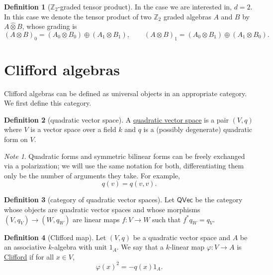 \documentclass[a4paper,10pt]{scrreprt}
\newcommand{\Z}{\mathbb{Z}}
\newcommand{\defn}[1]{\ul{#1}}
\theoremstyle{definition}
\newtheorem{definition}{Definition}[section]
\theoremstyle{plain}
\theoremstyle{remark}
\newtheorem{note}{Note}[section]
\begin{document}
\begin{definition}[$\Z_2$-graded tensor product]
  \label{def:z2gradedtensorproduct}
  In the case we are interested in, $d = 2$. In this case we denote the tensor product of two $\Z_{2}$ graded algebras $A$ and $B$ by $A \hat{\otimes} B$, whose grading is
  \begin{equation*}
    (A \otimes B)_{0} = (A_{0}\otimes B_{0}) \oplus (A_{1} \otimes B_{1}),\qquad
    (A \otimes B)_{1} = (A_{0}\otimes B_{1}) \oplus (A_{1} \otimes B_{0}).
  \end{equation*}
\end{definition}


\section{Clifford algebras}
Clifford algebras can be defined as universal objects in an appropriate category. We first define this category.
\begin{definition}[quadratic vector space]
  \label{def:quadraticvectorspace}
  A \defn{quadratic vector space} is a pair $(V, q)$ where $V$ is a vector space over a field $k$ and $q$ is a (possibly degenerate) quadratic form on $V$.
\end{definition}
\begin{note}
  Quadratic forms and symmetric bilinear forms can be freely exchanged via a polarization; we will use the same notation for both, differentiating them only be the number of arguments they take. For example,
  \begin{equation*}
    q(v) = q(v,v).
  \end{equation*}
\end{note}

\begin{definition}[category of quadratic vector spaces]
  \label{def:categoryofquadraticvectorspaces}
  Let $\mathsf{QVec}$ be the category whose objects are quadratic vector spaces and whose morphisms $(V, q_{V}) \to (W, q_{W})$ are linear maps $f\colon V \to W$ such that $f^{*}q_{W} = q_{V}$.
\end{definition}

\begin{definition}[Clifford map]
  \label{def:cliffordmap}
  Let $(V,q)$ be a quadratic vector space and $A$ be an associative $k$-algebra with unit $1_{A}$. We say that a $k$-linear map $\varphi\colon V \to A$ is \defn{Clifford} if for all $x \in V$,
  \begin{equation*}
    \varphi(x)^{2} = -q(x)1_{A}.
  \end{equation*}
\end{definition}
\end{document}
